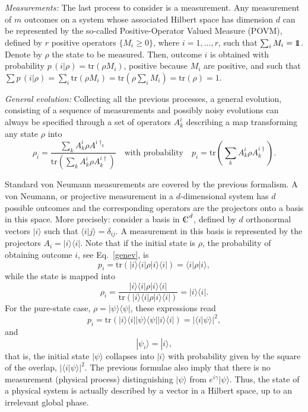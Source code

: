 \documentclass[a4paper]{article}
\def\tr{\mbox{tr}}
\def\one{\leavevmode\hbox{\small1\normalsize\kern-.33em1}}
\def\compl{\begin{picture}(8,8)\put(0,0){C}\put(3,0.3){\line(0,1){7}}\end{picture}}
\def\bra#1{\langle#1|} \def\ket#1{|#1\rangle}
\def\proj#1{\ket{#1}\!\bra{#1}}
\begin{document}
{\sl Measurements:} The last process to consider is a
measurement. Any measurement of $m$ outcomes on a system whose
associated Hilbert space has dimension $d$ can be represented by the so-called
Positive-Operator Valued Measure (POVM), defined by
$r$  positive operators $\{M_i\geq 0\}$, where
$i=1,\ldots,r$, such that $\sum_i M_i=\one$. Denote by $\rho$ the
state to be measured. Then, outcome $i$ is obtained with
probability $p\,(i|\rho)=\tr(\rho M_i)$, positive because $M_i$ are positive, and such that $\sum
p\,(i|\rho)=\sum_i \tr(\rho M_i)=\tr(\rho \sum_iM_i)=\tr(\rho)=1$. 

{\sl General evolution:} Collecting all the previous processes, a
general evolution, consisting of a sequence of measurements and
possibly noisy evolutions can always be specified through a set of
operators $A^i_k$ describing a map transforming any state $\rho$
into
\begin{equation}\label{genev}
    \rho_i=\frac{\sum_k A^i_k \rho A^{i\dagger_k}}
    {\tr(\sum_k A^i_k \rho A^{i\dagger}_k)} \quad \text{with probability}\quad p_i=\tr(\sum_k A^i_k \rho A^{i\dagger}_k).
\end{equation}


Standard von Neumann measurements are covered by
the previous formalism. A von Neumann, or projective measurement
in a $d$-dimensional system has $d$ possible outcomes and the
corresponding operators are the projectors onto a basis in this
space. More precisely: consider a basis in $\compl^d$, defined by 
$d$ orthonormal vectors ${\ket{i}}$ such that $\langle
i\ket{j}=\delta_{ij}$. A measurement in this basis is represented
by the projectors $A_i=\proj{i}$. Note that if the initial state
is $\rho$, the probability of obtaining outcome $i$, see Eq.~\eqref{genev}, is
\begin{equation}\label{vnpr}
    p_i=\tr(\proj i\rho\proj i)=\bra i\rho\ket i ,
\end{equation}
while the state is mapped into
\begin{equation}\label{vnev}
    \rho_i=\frac{\proj i\rho \proj i}
    {\tr(\proj i \rho \proj i)}=\proj i .
\end{equation}
For the pure-state case, $\rho=\proj\psi$, these expressions read
\begin{equation}\label{vnprpst}
    p_i=\tr(\proj i\proj\psi\proj i)=|\langle i\ket{\psi}|^2 ,
\end{equation}
and
\begin{equation}\label{vnev}
    \ket{\psi_i}=\ket i ,
\end{equation}
that is, the initial state $\ket{\psi}$ collapses into $\ket i$
with probability given by the square of the overlap, $|\langle
i\ket{\psi}|^2$. The previous formulae also imply that there is no
measurement (physical process) distinguishing $\ket{\psi}$ from
$e^{i\gamma}\ket{\psi}$. Thus, the state of a physical system is
actually described by a vector in a Hilbert space, up to an
irrelevant global phase.
\end{document}
